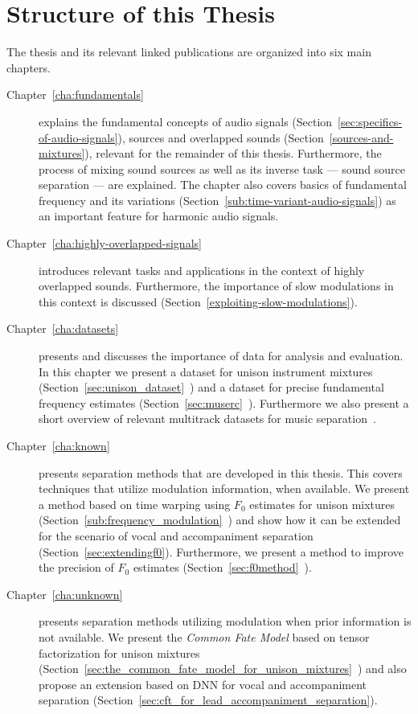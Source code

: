 \clearpage

\section{Structure of this Thesis}

The thesis and its relevant linked publications are organized into six main chapters.
\begin{description}
  \item[Chapter~\ref{cha:fundamentals}] explains the fundamental concepts of audio signals (Section~\ref{sec:specifics-of-audio-signals}), sources and overlapped sounds (Section~\ref{sources-and-mixtures}), relevant for the remainder of this thesis.
  Furthermore, the process of mixing sound sources as well as its inverse task --- sound source separation --- are explained.
  The chapter also covers basics of fundamental frequency and its variations (Section~\ref{sub:time-variant-audio-signals}) as an important feature for harmonic audio signals.
  \item[Chapter~\ref{cha:highly-overlapped-signals}] introduces relevant tasks and applications in the context of highly overlapped sounds.
  Furthermore, the importance of slow modulations in this context is discussed (Section~\ref{exploiting-slow-modulations}).
  \item[Chapter~\ref{cha:datasets}] presents and discusses the importance of data for analysis and evaluation.
  In this chapter we present a dataset for unison instrument mixtures (Section~\ref{sec:unison_dataset}~\cite{oss_unison, stoeter14}) and a dataset for precise fundamental frequency estimates (Section~\ref{sec:muserc}~\cite{oss_muserc, stoeter15acm}). Furthermore we also present a short overview of relevant multitrack datasets for music separation~\cite{liutkus17, stoeter18sisec}.
  \item[Chapter~\ref{cha:known}] presents separation methods that are developed in this thesis. This covers techniques that utilize modulation information, when available. We present a method based on time warping using $F_0$ estimates for unison mixtures (Section~\ref{sub:frequency_modulation}~\cite{stoeter14}) and show how it can be extended for the scenario of vocal and accompaniment separation (Section~\ref{sec:extendingf0}). Furthermore, we present a method to improve the precision of $F_0$ estimates (Section~\ref{sec:f0method}~\cite{stoeter15icassp}).
  \item[Chapter~\ref{cha:unknown}] presents separation methods utilizing modulation when prior information is not available. We present the \emph{Common Fate Model} based on tensor factorization for unison mixtures (Section~\ref{sec:the_common_fate_model_for_unison_mixtures}~\cite{stoeter16}) and also propose an extension based on \acs{DNN} for vocal and accompaniment separation (Section~\ref{sec:cft_for_lead_accompaniment_separation}).

\end{description}
